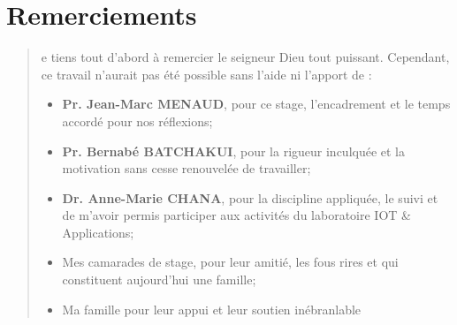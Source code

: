 %
%
%
%
%
%
\chapter*{Remerciements}
\begin{SingleSpace}
\begin{quote}
e tiens tout d'abord à remercier le seigneur Dieu tout puissant. Cependant, ce travail n'aurait pas été possible sans l'aide ni l'apport de :
\vspace{6mm}
\begin{itemize}[label=\textcolor{darkgray}{\scalebox{1.2}{\HandCuffRight}}]
	\item \textbf{Pr. Jean-Marc MENAUD}, pour ce stage, l'encadrement et le temps accordé pour nos réflexions;
    \item \textbf{Pr. Bernab\'{e} BATCHAKUI}, pour la rigueur inculquée et la motivation sans cesse renouvelée de travailler;
    \item \textbf{Dr. Anne-Marie CHANA}, pour la discipline appliquée, le suivi et de m'avoir permis participer aux activités du laboratoire IOT \& Applications;
    \item Mes camarades de stage, pour leur amitié, les fous rires et qui constituent aujourd'hui une famille;
    \item Ma famille pour leur appui et leur soutien inébranlable 

    
\end{itemize}

\end{quote}
\end{SingleSpace}
\clearpage
